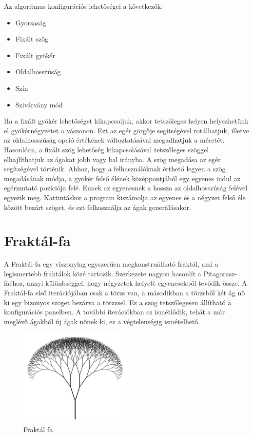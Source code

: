 \par Az algoritmus konfigurációs lehetőségei a következők:
\begin{itemize}
	\item Gyorsaság
	\item Fixált szög
	\item Fixált gyökér
	\item Oldalhosszúság
	\item Szín
	\item Szivárvány mód
\end{itemize}
Ha a fixált gyökér lehetőséget kikapcsoljuk, akkor tetszőleges helyen helyezhetünk el gyökérnégyzetet a vászonon. Ezt az egér görgője segítségével rotálhatjuk, illetve az oldalhosszúság opció értékének változtatásával megadhatjuk a méretét. Hasonlóan, a fixált szög lehetőség kikapcsolásával tetszőleges szöggel elhajlíthatjuk az ágakat jobb vagy bal irányba. A szög megadása az egér segítségével történik. Ahhoz, hogy a felhasználóknak érthető legyen a szög megadásának módja, a gyökér felső élének középpontjából egy egyenes indul az egérmutató pozíciója felé. Ennek az egyenesnek a hossza az oldalhosszúság felével egyezik meg. Kattintáskor a program kiszámolja az egyenes és a négyzet felső éle között bezárt szöget, és ezt felhasználja az ágak generálásakor.
\section{Fraktál-fa}
A Fraktál-fa egy viszonylag egyszerűen megkonstruálható fraktál, ami a legismertebb fraktálok közé tartozik. Szerkezete nagyon hasonlít a Pitagorasz-fáéhoz, annyi különbséggel, hogy négyzetek helyett egyenesekből tevődik össze. A Fraktál-fa első iterációjában csak a törzs van, a másodikban a törzsből két ág nő ki egy bizonyos szöget bezárva a törzzsel. Ez a szög tetszőlegesen állítható a konfigurációs panelben. A további iterációkban ez ismétlődik, tehát a már meglévő ágakból új ágak nőnek ki, ez a végtelenségig ismételhető.  
\begin{figure}[!ht]
	\begin{center}
		\includegraphics[width=0.5\textwidth]{img/FractalTree}
		\caption[labelInTOC]{Fraktál fa}
	\end{center}
\end{figure}

